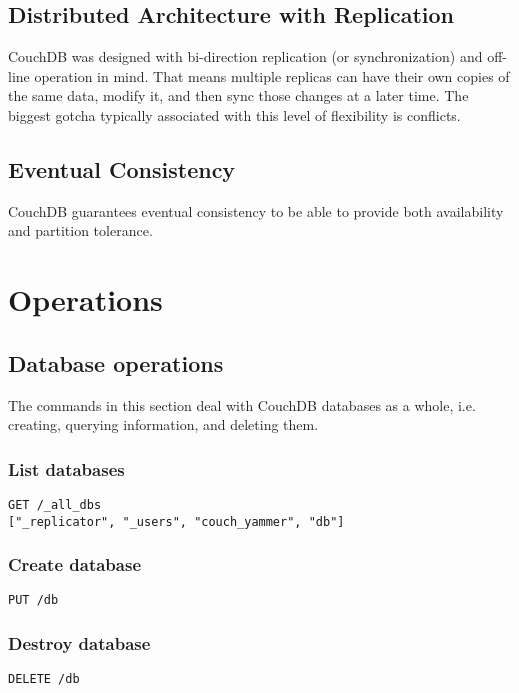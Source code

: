 \subsection{Distributed Architecture with Replication}

CouchDB was designed with bi-direction replication (or synchronization) and off-line operation in mind. That means multiple replicas can have their own copies of the same data, modify it, and then sync those changes at a later time. The biggest gotcha typically associated with this level of flexibility is conflicts.

\subsection{Eventual Consistency}

CouchDB guarantees eventual consistency to be able to provide both availability and partition tolerance.

\section{Operations}

\subsection{Database operations}

The commands in this section deal with CouchDB databases as a whole, i.e. creating, querying information, and deleting them.
  
\subsubsection{List databases}
\begin{lstlisting}
GET /_all_dbs 
["_replicator", "_users", "couch_yammer", "db"]
\end{lstlisting}

\subsubsection{Create database}
\begin{lstlisting}
PUT /db
\end{lstlisting}

\subsubsection{Destroy database}
\begin{lstlisting}
DELETE /db
\end{lstlisting}
  
